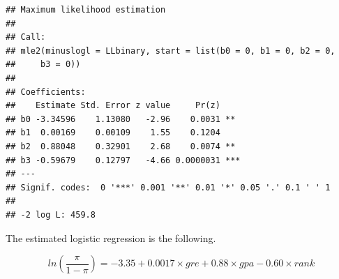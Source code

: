 \documentclass[
]{article}
\newenvironment{Shaded}{\begin{snugshade}}{\end{snugshade}}
\newcommand{\AttributeTok}[1]{\textcolor[rgb]{0.77,0.63,0.00}{#1}}
\newcommand{\ControlFlowTok}[1]{\textcolor[rgb]{0.13,0.29,0.53}{\textbf{#1}}}
\newcommand{\DecValTok}[1]{\textcolor[rgb]{0.00,0.00,0.81}{#1}}
\newcommand{\FunctionTok}[1]{\textcolor[rgb]{0.00,0.00,0.00}{#1}}
\newcommand{\NormalTok}[1]{#1}
\newcommand{\OtherTok}[1]{\textcolor[rgb]{0.56,0.35,0.01}{#1}}
\newcommand{\SpecialCharTok}[1]{\textcolor[rgb]{0.00,0.00,0.00}{#1}}
\begin{document}
\begin{Shaded}
\end{Shaded}

\begin{verbatim}
## Maximum likelihood estimation
## 
## Call:
## mle2(minuslogl = LLbinary, start = list(b0 = 0, b1 = 0, b2 = 0, 
##     b3 = 0))
## 
## Coefficients:
##    Estimate Std. Error z value     Pr(z)    
## b0 -3.34596    1.13080   -2.96    0.0031 ** 
## b1  0.00169    0.00109    1.55    0.1204    
## b2  0.88048    0.32901    2.68    0.0074 ** 
## b3 -0.59679    0.12797   -4.66 0.0000031 ***
## ---
## Signif. codes:  0 '***' 0.001 '**' 0.01 '*' 0.05 '.' 0.1 ' ' 1
## 
## -2 log L: 459.8
\end{verbatim}

The estimated logistic regression is the following.

\[ln(\frac{\pi}{1-\pi}) = -3.35 + 0.0017 \times gre + 0.88 \times gpa - 0.60 \times rank\]
\end{document}
